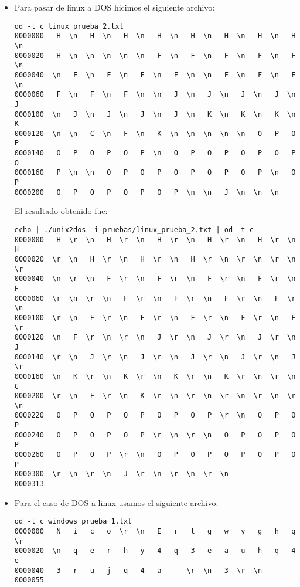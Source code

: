 \documentclass[a4paper,11pt]{article}
\begin{document}
\begin{itemize}
\item Para pasar de linux a DOS hicimos el siguiente archivo:
\begin{verbatim}
od -t c linux_prueba_2.txt 
0000000   H  \n   H  \n   H  \n   H  \n   H  \n   H  \n   H  \n   H  \n
0000020   H  \n  \n  \n  \n  \n   F  \n   F  \n   F  \n   F  \n   F  \n
0000040  \n   F  \n   F  \n   F  \n   F  \n  \n   F  \n   F  \n   F  \n
0000060   F  \n   F  \n   F  \n  \n   J  \n   J  \n   J  \n   J  \n   J
0000100  \n   J  \n   J  \n   J  \n   J  \n   K  \n   K  \n   K  \n   K
0000120  \n  \n   C  \n   F  \n   K  \n  \n  \n  \n  \n   O   P   O   P
0000140   O   P   O   P   O   P  \n   O   P   O   P   O   P   O   P   O
0000160   P  \n  \n   O   P   O   P   O   P   O   P   O   P  \n   O   P
0000200   O   P   O   P   O   P   O   P  \n  \n   J  \n  \n  \n
\end{verbatim}

El resultado obtenido fue:
\begin{verbatim}
echo | ./unix2dos -i pruebas/linux_prueba_2.txt | od -t c
0000000   H  \r  \n   H  \r  \n   H  \r  \n   H  \r  \n   H  \r  \n   H
0000020  \r  \n   H  \r  \n   H  \r  \n   H  \r  \n  \r  \n  \r  \n  \r
0000040  \n  \r  \n   F  \r  \n   F  \r  \n   F  \r  \n   F  \r  \n   F
0000060  \r  \n  \r  \n   F  \r  \n   F  \r  \n   F  \r  \n   F  \r  \n
0000100  \r  \n   F  \r  \n   F  \r  \n   F  \r  \n   F  \r  \n   F  \r
0000120  \n   F  \r  \n  \r  \n   J  \r  \n   J  \r  \n   J  \r  \n   J
0000140  \r  \n   J  \r  \n   J  \r  \n   J  \r  \n   J  \r  \n   J  \r
0000160  \n   K  \r  \n   K  \r  \n   K  \r  \n   K  \r  \n  \r  \n   C
0000200  \r  \n   F  \r  \n   K  \r  \n  \r  \n  \r  \n  \r  \n  \r  \n
0000220   O   P   O   P   O   P   O   P   O   P  \r  \n   O   P   O   P
0000240   O   P   O   P   O   P  \r  \n  \r  \n   O   P   O   P   O   P
0000260   O   P   O   P  \r  \n   O   P   O   P   O   P   O   P   O   P
0000300  \r  \n  \r  \n   J  \r  \n  \r  \n  \r  \n
0000313
\end{verbatim}

\item Para el caso de DOS a linux usamos el siguiente archivo:
\begin{verbatim}
od -t c windows_prueba_1.txt 
0000000   N   i   c   o  \r  \n   E   r   t   g   w   y   g   h   q  \r
0000020  \n   q   e   r   h   y   4   q   3   e   a   u   h   q   4   e
0000040   3   r   u   j   q   4   a      \r  \n   3  \r  \n
0000055
\end{verbatim}


\end{itemize}
\end{document}
